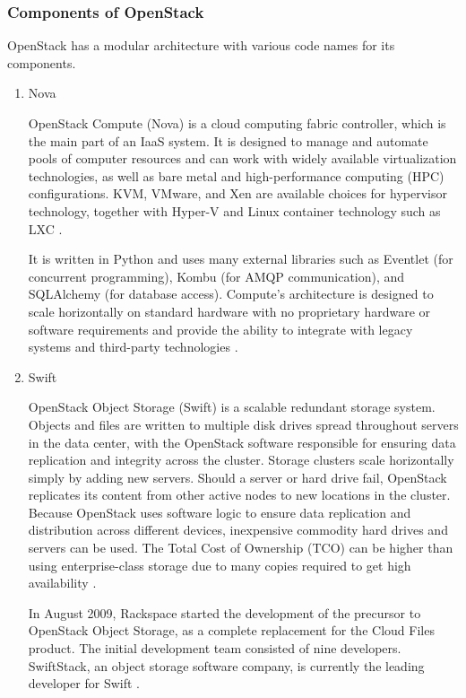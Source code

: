      \subsubsection{Components of OpenStack}
         \par
         OpenStack has a modular architecture with various code names for its components.
         \begin{enumerate}
         \item Nova
         \par
         OpenStack Compute (Nova) is a cloud computing fabric controller, which is the main part of an IaaS system. It is designed to manage and automate pools of computer resources and can work with widely available virtualization technologies, as well as bare metal and high-performance computing (HPC) configurations. KVM, VMware, and Xen are available choices for hypervisor technology, together with Hyper-V and Linux container technology such as LXC \cite{openstack}\cite{wiki}.
         \par
         It is written in Python and uses many external libraries such as Eventlet (for concurrent programming), Kombu (for AMQP communication), and SQLAlchemy (for database access). Compute's architecture is designed to scale horizontally on standard hardware with no proprietary hardware or software requirements and provide the ability to integrate with legacy systems and third-party technologies \cite{openstack}\cite{wiki}.
        \item Swift
        \par
        OpenStack Object Storage (Swift) is a scalable redundant storage system. Objects and files are written to multiple disk drives spread throughout servers in the data center, with the OpenStack software responsible for ensuring data replication and integrity across the cluster. Storage clusters scale horizontally simply by adding new servers. Should a server or hard drive fail, OpenStack replicates its content from other active nodes to new locations in the cluster. Because OpenStack uses software logic to ensure data replication and distribution across different devices, inexpensive commodity hard drives and servers can be used. The Total Cost of Ownership (TCO) can be higher than using enterprise-class storage due to many copies required to get high availability \cite{openstack}\cite{wiki}.
        \par
        In August 2009, Rackspace started the development of the precursor to OpenStack Object Storage, as a complete replacement for the Cloud Files product. The initial development team consisted of nine developers. SwiftStack, an object storage software company, is currently the leading developer for Swift \cite{wiki}.

\end{enumerate}
